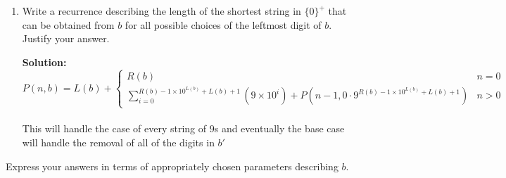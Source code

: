 \documentclass[11pt]{article}
\begin{document}
\begin{enumerate}
\item
\begin{question}
Write a recurrence describing the length of the shortest string in $\{0\}^+$ that can be obtained from $b$ for all possible choices of the leftmost digit of $b$. Justify your answer.
\end{question}

\begin{solution}
{\bf Solution:}\\
$$
P(n, b) = L(b) +
\begin{cases}
    R(b) & n = 0\\
    \sum _{i=0}^{R(b) - 1\times 10^{L(b)} + L(b) + 1}(9\times10^i) + P(n-1, 0\cdot 9^{R(b) - 1\times 10^{L(b)} + L(b) + 1}) &  n > 0
\end{cases}
$$\\
This will handle the case of every string of $9$s and eventually the base case will handle the removal of all of the digits in $b'$\\
\end{solution}
\end{enumerate}
\begin{question}
Express your answers in terms of appropriately chosen parameters describing $b$.
\end{question}
\end{document}
